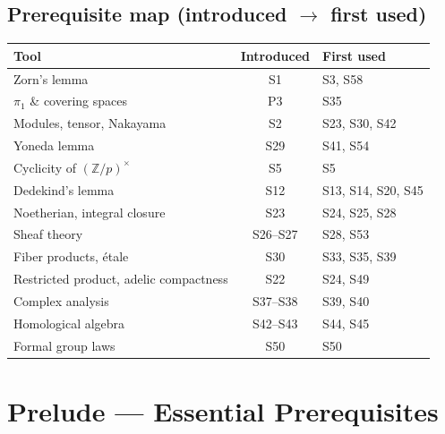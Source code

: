 \documentclass[11pt,a4paper]{article}
\newcommand{\Z}{\mathbb{Z}}
\begin{document}
	\subsection*{Prerequisite map (introduced $\to$ first used)}
	\begin{center}\small
		\begin{tabular}{|p{5cm}|c|p{5cm}|}
			\hline
			\textbf{Tool} & \textbf{Introduced} & \textbf{First used} \\
			\hline
			Zorn's lemma & S1 & S3, S58 \\
			$\pi_1$ \& covering spaces & P3 & S35 \\
			Modules, tensor, Nakayama & S2 & S23, S30, S42 \\
			Yoneda lemma & S29 & S41, S54 \\
			Cyclicity of $(\Z/p)^\times$ & S5 & S5 \\
			Dedekind's lemma & S12 & S13, S14, S20, S45 \\
			Noetherian, integral closure & S23 & S24, S25, S28 \\
			Sheaf theory & S26--S27 & S28, S53 \\
			Fiber products, \'etale & S30 & S33, S35, S39 \\
			Restricted product, adelic compactness & S22 & S24, S49 \\
			Complex analysis & S37--S38 & S39, S40 \\
			Homological algebra & S42--S43 & S44, S45 \\
			Formal group laws & S50 & S50 \\
			\hline
		\end{tabular}
	\end{center}
	\newpage
	
	\section{Prelude --- Essential Prerequisites}
	
\end{document}
